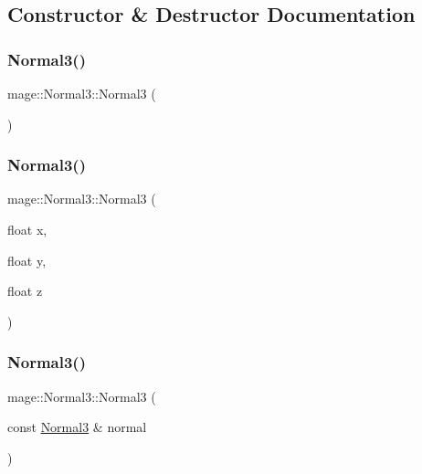 \subsection{Constructor \& Destructor Documentation}
\hypertarget{structmage_1_1_normal3_a66ec99f0de4f8231f747e37a4da65cc4}{}\label{structmage_1_1_normal3_a66ec99f0de4f8231f747e37a4da65cc4} 
\subsubsection{\texorpdfstring{Normal3()}{Normal3()}\hspace{0.1cm}{\footnotesize\ttfamily [1/10]}}
{\footnotesize\ttfamily mage\+::\+Normal3\+::\+Normal3 (\begin{DoxyParamCaption}{ }\end{DoxyParamCaption})}

\hypertarget{structmage_1_1_normal3_a59094c1f96a9721cd8846c5c6ec06f93}{}\label{structmage_1_1_normal3_a59094c1f96a9721cd8846c5c6ec06f93} 
\subsubsection{\texorpdfstring{Normal3()}{Normal3()}\hspace{0.1cm}{\footnotesize\ttfamily [2/10]}}
{\footnotesize\ttfamily mage\+::\+Normal3\+::\+Normal3 (\begin{DoxyParamCaption}\item[{float}]{x,  }\item[{float}]{y,  }\item[{float}]{z }\end{DoxyParamCaption})}

\hypertarget{structmage_1_1_normal3_ada9c762e16b51177f3fc1aa6d5310b20}{}\label{structmage_1_1_normal3_ada9c762e16b51177f3fc1aa6d5310b20} 
\subsubsection{\texorpdfstring{Normal3()}{Normal3()}\hspace{0.1cm}{\footnotesize\ttfamily [3/10]}}
{\footnotesize\ttfamily mage\+::\+Normal3\+::\+Normal3 (\begin{DoxyParamCaption}\item[{const \hyperlink{structmage_1_1_normal3}{Normal3} \&}]{normal }\end{DoxyParamCaption})}


